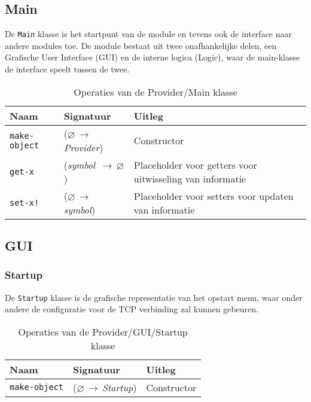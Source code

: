 \documentclass[a4paper, 11pt]{article}
\newcommand{\naar}{\,$\rightarrow$\,}
\renewcommand{\empty}{$\varnothing$}
\newcommand{\<}{\scriptsize\textless\normalsize}
\renewcommand{\>}{\scriptsize\textgreater\normalsize}
\begin{document}
\subsection{Main} %
De \texttt{Main} klasse is het startpunt van de module en tevens ook de interface naar andere modules toe. De module bestaat uit twee onafhankelijke delen, een Grafische User Interface (GUI) en de interne logica (Logic), waar de main-klasse de interface speelt tussen de twee.
\begin{table}[H]
	\begin{center}
		{
			\begin{tabular}{|l l l|}
				\hline
				\textbf{Naam} & \textbf{Signatuur} & \textbf{Uitleg}\\
				\hline
				\texttt{make-object} & (\empty \naar \textit{Provider}) & Constructor\\
				\hline
				\texttt{get-x} & (\textit{symbol} \naar \empty) & Placeholder voor getters voor uitwisseling van informatie\\
				\texttt{set-x!} & (\empty \naar \textit{symbol}) & Placeholder voor setters voor updaten van informatie\\
				\hline
		\end{tabular}}
		\caption{Operaties van de Provider/Main klasse}
	\end{center}
\end{table}

\subsection{GUI} %

\subsubsection{Startup} %
De \texttt{Startup} klasse is de grafische representatie van het opstart menu, waar onder andere de configuratie voor de TCP verbinding zal kunnen gebeuren.
\begin{table}[H]
	\begin{center}
		{
			\begin{tabular}{|l l l|}
				\hline
				\textbf{Naam} & \textbf{Signatuur} & \textbf{Uitleg}\\
				\hline
				\texttt{make-object} & (\empty \naar \textit{Startup}) & Constructor\\
				\hline
		\end{tabular}}
		\caption{Operaties van de Provider/GUI/Startup klasse}
	\end{center}
\end{table}
\end{document}
